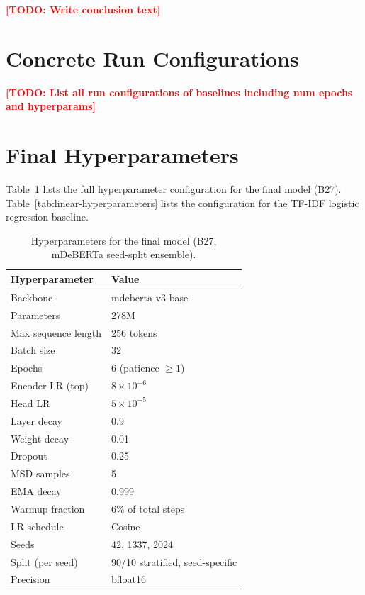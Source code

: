 \documentclass{article}
\newcommand{\TODO}[1]{\textcolor{red}{\textbf{[TODO: #1]}}}
\begin{document}
\TODO{Write conclusion text}




\appendix

\FloatBarrier
\section{Concrete Run Configurations}
\label{app:configs}
\TODO{List all run configurations of baselines including num epochs and hyperparams}

\FloatBarrier
\section{Final Hyperparameters}
\label{app:hparams}

Table~\ref{tab:hparams} lists the full hyperparameter configuration for the final model (B27).
Table~\ref{tab:linear-hyperparameters} lists the configuration for the TF-IDF logistic regression baseline.

\begin{table}[H]
\centering
\caption{Hyperparameters for the final model (B27, mDeBERTa seed-split ensemble).}
\label{tab:hparams}
\vskip 0.1in
\begin{tabular}{ll}
\toprule
\textbf{Hyperparameter} & \textbf{Value} \\
\midrule
Backbone              & mdeberta-v3-base \\
Parameters            & 278M \\
Max sequence length   & 256 tokens \\
Batch size            & 32 \\
Epochs                & 6 (patience $\geq 1$) \\
Encoder LR (top)      & $8 \times 10^{-6}$ \\
Head LR               & $5 \times 10^{-5}$ \\
Layer decay           & 0.9 \\
Weight decay          & 0.01 \\
Dropout               & 0.25 \\
MSD samples           & 5 \\
EMA decay             & 0.999 \\
Warmup fraction       & 6\% of total steps \\
LR schedule           & Cosine \\
Seeds                 & 42, 1337, 2024 \\
Split (per seed)      & 90/10 stratified, seed-specific \\
Precision             & bfloat16 \\
\bottomrule
\end{tabular}
\end{table}
\end{document}
